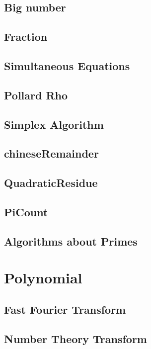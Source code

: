 \subsection{Big number}

\subsection{Fraction}

\subsection{Simultaneous Equations}

\subsection{Pollard Rho}

\subsection{Simplex Algorithm}

\subsection{chineseRemainder}

\subsection{QuadraticResidue}

\subsection{PiCount}

\subsection{Algorithms about Primes}



\section{Polynomial}
\subsection{Fast Fourier Transform}

\subsection{Number Theory Transform}


